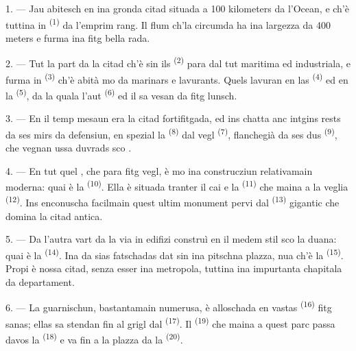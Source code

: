 \VUsaut{2.0mm}
\VUsaut{3.0mm}
\VUfilet{16mm}
\VUsaut{5.6mm}
\VUsaut{1.4mm}
\VUsaut{2.2mm}

\VUsaut{3.0mm}

1. --- Jau abitesch en ina gronda citad situada a 100 kilometers da l'Ocean, e ch'è
tuttina in  \textsuperscript{(1)} da l'emprim rang. Il flum ch'la circumda ha
ina largezza da 400 meters e furma ina fitg bella rada.

2. --- Tut la part da la citad ch'è sin ils  \textsuperscript{(2)} para dal tut
maritima ed industriala, e furma in  \textsuperscript{(3)} ch'è abità mo da
marinars e lavurants. Quels lavuran en las  \textsuperscript{(4)} ed en la
 \textsuperscript{(5)}, da la quala l'aut 
\textsuperscript{(6)} ed il  sa vesan da fitg lunsch.

3. --- En il temp mesaun era la citad fortifitgada, ed ins chatta anc intgins rests
da ses mirs da defensiun, en spezial la  \textsuperscript{(8)} dal vegl
 \textsuperscript{(7)}, flanchegià da ses dus 
\textsuperscript{(9)}, che vegnan ussa duvrads sco .

4. --- En tut quel , che para fitg vegl, è mo ina construcziun
relativamain moderna: quai è la  \textsuperscript{(10)}. Ella è situada tranter
il cai e la  \textsuperscript{(11)} che maina a la veglia  \textsuperscript{(12)}. Ins enconuscha facilmain quest ultim monument pervi dal
 \textsuperscript{(13)} gigantic che domina la citad antica.

5. --- Da l'autra vart da la via  in edifizi construì en il medem stil sco
la duana: quai è la  \textsuperscript{(14)}. Ina da sias fatschadas dat sin
ina pitschna plazza, nua ch'è la  \textsuperscript{(15)}. Propi è nossa
citad, senza esser ina metropola, tuttina ina impurtanta chapitala da departament.

\VUsaut{5.0mm}
\VUsaut{3.4mm}

6. --- La guarnischun, bastantamain numerusa, è alloschada en vastas 
\textsuperscript{(16)} fitg sanas; ellas sa stendan fin al grigl dal  \textsuperscript{(17)}. Il  \textsuperscript{(19)} che maina a
quest
parc passa davos la  \textsuperscript{(18)} e va fin a la plazza da la
 \textsuperscript{(20)}.

